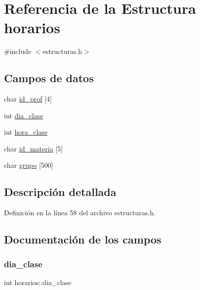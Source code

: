 \hypertarget{structhorarios}{}\section{Referencia de la Estructura horarios}
\label{structhorarios}


{\ttfamily \#include $<$estructuras.\+h$>$}

\subsection*{Campos de datos}
\begin{DoxyCompactItemize}
\item 
char \mbox{\hyperlink{structhorarios_a10531356ac4d127379c96ad1006873f8}{id\+\_\+prof}} \mbox{[}4\mbox{]}
\item 
int \mbox{\hyperlink{structhorarios_a514443404c267c542497e9c22f6d3e25}{dia\+\_\+clase}}
\item 
int \mbox{\hyperlink{structhorarios_a5ed630f7244ecfbe4c29f08ffb009472}{hora\+\_\+clase}}
\item 
char \mbox{\hyperlink{structhorarios_adbe2c73c92199ce4ac6e03b7cdbe9b72}{id\+\_\+materia}} \mbox{[}5\mbox{]}
\item 
char \mbox{\hyperlink{structhorarios_a435f7d8029b65cba591011c6d86ce284}{grupo}} \mbox{[}500\mbox{]}
\end{DoxyCompactItemize}


\subsection{Descripción detallada}


Definición en la línea 58 del archivo estructuras.\+h.



\subsection{Documentación de los campos}
\mbox{\label{structhorarios_a514443404c267c542497e9c22f6d3e25}} 
\subsubsection{\texorpdfstring{dia\+\_\+clase}{dia\_clase}}
{\footnotesize\ttfamily int horarios\+::dia\+\_\+clase}



